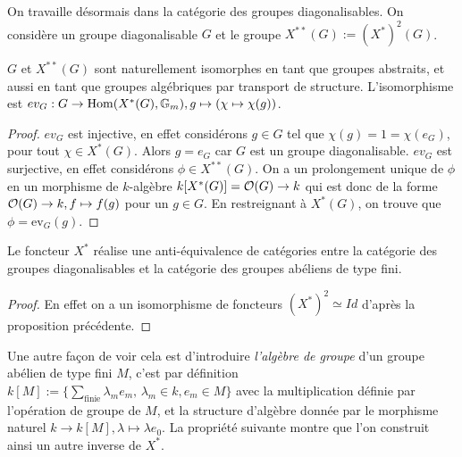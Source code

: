 On travaille désormais dans la catégorie des groupes diagonalisables. On considère un groupe diagonalisable $G$ et le groupe $X^{**}(G):=(X^*)^2(G)$.

\begin{prop}\label{GDiagNatuIsomBidualite}
$G$ et $X^{**}(G)$ sont naturellement isomorphes en tant que groupes abstraits, et aussi en tant que groupes algébriques par transport de structure. L'isomorphisme est $ev_G : G\rightarrow \operatorname{Hom} (X^*(G),\mathbb{G} _m), g\mapsto (\chi\mapsto \chi(g))$.
\end{prop}
\begin{proof}
$ev_G$ est injective, en effet considérons $g\in G$ tel que $\chi(g)=1=\chi(e_G)$, pour tout $\chi\in X^*(G)$. Alors $g=e_G$ car $G$ est un groupe diagonalisable. $ev_G$ est surjective, en effet considérons $\phi\in X^{**}(G)$. On a un prolongement unique de $\phi$ en un morphisme de $k$-algèbre $k[X^*(G)]=\mathcal{O}(G)\rightarrow k$ qui est donc de la forme $\mathcal{O}(G)\rightarrow k, f\mapsto f(g)$ pour un $g\in G$. En restreignant à $X^*(G)$, on trouve que $\phi=\textrm{ev}_G(g)$.
\end{proof}

\begin{cor}\label{EqCatGpDiagGpAb}
Le foncteur $X^*$ réalise une anti-équivalence de catégories entre la catégorie des groupes diagonalisables et la catégorie des groupes abéliens de type fini. 
\end{cor}
\begin{proof}
En effet on a un isomorphisme de foncteurs $(X^*)^2\simeq Id$ d'après la proposition précédente.
\end{proof}

Une autre façon de voir cela est d'introduire \textit{l'algèbre de groupe} d'un groupe abélien de type fini $M$, c'est par définition $k[M]:=\lbrace \sum_{\text{finie}} \lambda_m e_m,\,\lambda_m\in k,e_m\in M \rbrace$ avec la multiplication définie par l'opération de groupe de $M$, et la structure d'algèbre donnée par le morphisme naturel $k\rightarrow k[M],\lambda\mapsto \lambda e_0$. La propriété suivante montre que l'on construit ainsi un autre inverse de $X^*$.


